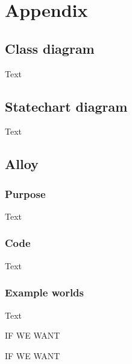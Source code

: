 \documentclass{article}
\begin{document}
\iffalse SECTION 5 \fi 
\section{Appendix}
\subsection{Class diagram}
Text
\subsection{Statechart diagram}
Text
\subsection{Alloy}
\subsubsection{Purpose}
Text
\subsubsection{Code}
Text
\subsubsection{Example worlds}
Text

\listoffigures
IF WE WANT
\listoftables
IF WE WANT
\end{document}
